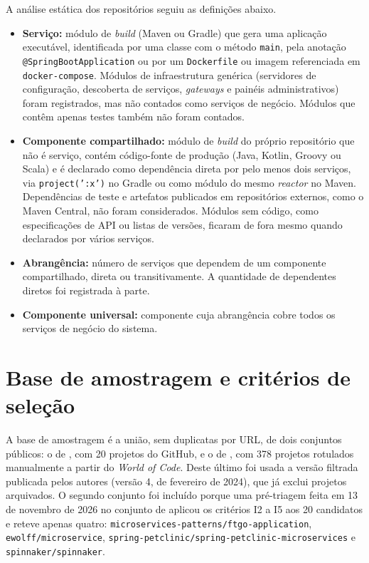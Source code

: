 A análise estática dos repositórios seguiu as definições abaixo.

\begin{itemize}
    \item \textbf{Serviço:} módulo de \textit{build} (Maven ou Gradle) que gera uma aplicação executável, identificada por uma classe com o método \texttt{main}, pela anotação \texttt{@SpringBootApplication} ou por um \texttt{Dockerfile} ou imagem referenciada em \texttt{docker-compose}. Módulos de infraestrutura genérica (servidores de configuração, descoberta de serviços, \textit{gateways} e painéis administrativos) foram registrados, mas não contados como serviços de negócio. Módulos que contêm apenas testes também não foram contados.
    \item \textbf{Componente compartilhado:} módulo de \textit{build} do próprio repositório que não é serviço, contém código-fonte de produção (Java, Kotlin, Groovy ou Scala) e é declarado como dependência direta por pelo menos dois serviços, via \texttt{project(':x')} no Gradle ou como módulo do mesmo \textit{reactor} no Maven. Dependências de teste e artefatos publicados em repositórios externos, como o Maven Central, não foram considerados. Módulos sem código, como especificações de API ou listas de versões, ficaram de fora mesmo quando declarados por vários serviços.
    \item \textbf{Abrangência:} número de serviços que dependem de um componente compartilhado, direta ou transitivamente. A quantidade de dependentes diretos foi registrada à parte.
    \item \textbf{Componente universal:} componente cuja abrangência cobre todos os serviços de negócio do sistema.
\end{itemize}

\section{Base de amostragem e critérios de seleção}
\label{sec:selecao}

A base de amostragem é a união, sem duplicatas por URL, de dois conjuntos públicos: o de , com 20 projetos do GitHub, e o de , com 378 projetos rotulados manualmente a partir do \textit{World of Code}. Deste último foi usada a versão filtrada publicada pelos autores (versão 4, de fevereiro de 2024), que já exclui projetos arquivados. O segundo conjunto foi incluído porque uma pré-triagem feita em 13 de novembro de 2026 no conjunto de  aplicou os critérios I2 a I5 aos 20 candidatos e reteve apenas quatro: \texttt{microservices-patterns/ftgo-application}, \texttt{ewolff/microservice}, \texttt{spring-petclinic/spring-petclinic-microservices} e \texttt{spinnaker/spinnaker}.


